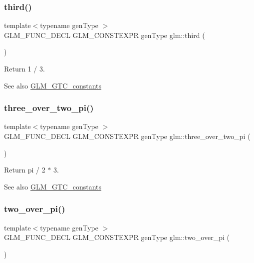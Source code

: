 \subsubsection{\texorpdfstring{third()}{third()}}
{\footnotesize\ttfamily template$<$typename gen\+Type $>$ \\
G\+L\+M\+\_\+\+F\+U\+N\+C\+\_\+\+D\+E\+CL G\+L\+M\+\_\+\+C\+O\+N\+S\+T\+E\+X\+PR gen\+Type glm\+::third (\begin{DoxyParamCaption}{ }\end{DoxyParamCaption})}

Return 1 / 3. \begin{DoxySeeAlso}{See also}
\hyperlink{group__gtc__constants}{G\+L\+M\+\_\+\+G\+T\+C\+\_\+constants} 
\end{DoxySeeAlso}
\mbox{\label{group__gtc__constants_gae94950df74b0ce382b1fc1d978ef7394}} 
\subsubsection{\texorpdfstring{three\+\_\+over\+\_\+two\+\_\+pi()}{three\_over\_two\_pi()}}
{\footnotesize\ttfamily template$<$typename gen\+Type $>$ \\
G\+L\+M\+\_\+\+F\+U\+N\+C\+\_\+\+D\+E\+CL G\+L\+M\+\_\+\+C\+O\+N\+S\+T\+E\+X\+PR gen\+Type glm\+::three\+\_\+over\+\_\+two\+\_\+pi (\begin{DoxyParamCaption}{ }\end{DoxyParamCaption})}

Return pi / 2 $\ast$ 3. \begin{DoxySeeAlso}{See also}
\hyperlink{group__gtc__constants}{G\+L\+M\+\_\+\+G\+T\+C\+\_\+constants} 
\end{DoxySeeAlso}
\mbox{\label{group__gtc__constants_ga74eadc8a211253079683219a3ea0462a}} 
\subsubsection{\texorpdfstring{two\+\_\+over\+\_\+pi()}{two\_over\_pi()}}
{\footnotesize\ttfamily template$<$typename gen\+Type $>$ \\
G\+L\+M\+\_\+\+F\+U\+N\+C\+\_\+\+D\+E\+CL G\+L\+M\+\_\+\+C\+O\+N\+S\+T\+E\+X\+PR gen\+Type glm\+::two\+\_\+over\+\_\+pi (\begin{DoxyParamCaption}{ }\end{DoxyParamCaption})}

